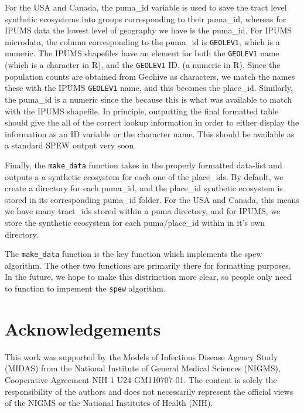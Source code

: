 \documentclass{article}
\begin{document}
For the USA and Canada, the puma\_id variable is used to save the tract level synthetic ecosystems into groups corresponding to their puma\_id, whereas for IPUMS data the lowest level of geography we have is the puma\_id. For IPUMS microdata, the column corresponding to the puma\_id is \verb|GEOLEV1|, which is a numeric. The IPUMS shapefiles have an element for both the \verb|GEOLEV1| name (which is a character in R), and the \verb|GEOLEV1| ID, (a numeric in R). Since the population counts are obtained from Geohive as characters, we match the names these with the IPUMS \verb|GEOLEV1| name, and this becomes the place\_id. Similarly, the puma\_id is a numeric since the because this is what was available to match with the IPUMS shapefile. In principle, outputting the final formatted table should give the all of the correct lookup information in order to either display the information as an ID variable or the character name. This should be available as a standard SPEW output very soon. 

Finally, the \verb|make_data| function takes in the properly formatted data-list and outputs a a synthetic ecosystem for each one of the place\_ids. By default, we create a directory for each puma\_id, and the place\_id synthetic ecosystem is stored in its corresponding puma\_id folder. For the USA and Canada, this means we have many tract\_ids stored within a puma directory, and for IPUMS, we store the synthetic ecosystem for each puma/place\_id within in it's own directory. 

The \verb|make_data| function is the key function which implements the spew algorithm. The other two functions are primarily there for formatting purposes. In the future, we hope to make this distrinction more clear, so people only need to function to impement the \verb|spew| algorithm. 

\newpage 
\section{Acknowledgements}
This work was supported by the Models of Infectious Disease Agency Study (MIDAS) from the National Institute of General Medical Sciences (NIGMS), Cooperative Agreement NIH 1 U24 GM110707-01. The content is solely the responsibility of the authors and does not necessarily represent the official views of the NIGMS or the National Institutes of Health (NIH).
\end{document}
